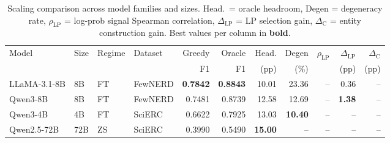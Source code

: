 \begin{table}[t]
\centering
\small
\setlength{\tabcolsep}{4pt}
\begin{tabular}{llll rrr r rr r}
\toprule
Model & Size & Regime & Dataset & Greedy & Oracle & Head. & Degen & $\rho_{\text{LP}}$ & $\Delta_{\text{LP}}$ & $\Delta_{\text{C}}$ \\
 & & & & F1 & F1 & (pp) & (\%) & & (pp) & (pp) \\
\midrule
LLaMA-3.1-8B & 8B & FT & FewNERD & \textbf{0.7842} & \textbf{0.8843} & 10.01 & 23.36 & -- & 0.36 & -- \\
Qwen3-8B & 8B & FT & FewNERD & 0.7481 & 0.8739 & 12.58 & 12.69 & -- & \textbf{1.38} & -- \\
Qwen3-4B & 4B & FT & SciERC & 0.6622 & 0.7925 & 13.03 & \textbf{10.40} & -- & -- & -- \\
Qwen2.5-72B & 72B & ZS & SciERC & 0.3990 & 0.5490 & \textbf{15.00} & -- & -- & -- & -- \\
\bottomrule
\end{tabular}
\caption{Scaling comparison across model families and sizes. Head.\ = oracle headroom, Degen = degeneracy rate, $\rho_{\text{LP}}$ = log-prob signal Spearman correlation, $\Delta_{\text{LP}}$ = LP selection gain, $\Delta_{\text{C}}$ = entity construction gain. Best values per column in \textbf{bold}.}
\label{tab:scaling}
\end{table}
